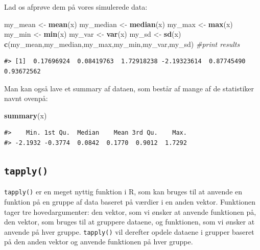 \documentclass[
]{book}
\newenvironment{Shaded}{\begin{snugshade}}{\end{snugshade}}
\newcommand{\CommentTok}[1]{\textcolor[rgb]{0.37,0.37,0.37}{\textit{#1}}}
\newcommand{\FunctionTok}[1]{\textcolor[rgb]{0.27,0.27,0.27}{\textbf{#1}}}
\newcommand{\NormalTok}[1]{#1}
\newcommand{\OtherTok}[1]{\textcolor[rgb]{0.37,0.37,0.37}{#1}}
\begin{document}
Lad os afprøve dem på vores simulerede data:

\begin{Shaded}
\begin{Highlighting}[]
\NormalTok{my\_mean }\OtherTok{\textless{}{-}} \FunctionTok{mean}\NormalTok{(x)}
\NormalTok{my\_median }\OtherTok{\textless{}{-}} \FunctionTok{median}\NormalTok{(x)}
\NormalTok{my\_max }\OtherTok{\textless{}{-}} \FunctionTok{max}\NormalTok{(x)}
\NormalTok{my\_min }\OtherTok{\textless{}{-}} \FunctionTok{min}\NormalTok{(x)}
\NormalTok{my\_var }\OtherTok{\textless{}{-}} \FunctionTok{var}\NormalTok{(x)}
\NormalTok{my\_sd }\OtherTok{\textless{}{-}} \FunctionTok{sd}\NormalTok{(x)}
\FunctionTok{c}\NormalTok{(my\_mean,my\_median,my\_max,my\_min,my\_var,my\_sd) }\CommentTok{\#print results}
\end{Highlighting}
\end{Shaded}

\begin{verbatim}
#> [1]  0.17696924  0.08419763  1.72918238 -2.19323614  0.87745490  0.93672562
\end{verbatim}

Man kan også lave et summary af dataen, som består af mange af de statistiker navnt ovenpå:

\begin{Shaded}
\begin{Highlighting}[]
\FunctionTok{summary}\NormalTok{(x)}
\end{Highlighting}
\end{Shaded}

\begin{verbatim}
#>    Min. 1st Qu.  Median    Mean 3rd Qu.    Max. 
#> -2.1932 -0.3774  0.0842  0.1770  0.9012  1.7292
\end{verbatim}

\subsection{\texorpdfstring{\texttt{tapply()}}{tapply()}}\label{tapply}

\texttt{tapply()} er en meget nyttig funktion i R, som kan bruges til at anvende en funktion på en gruppe af data baseret på værdier i en anden vektor. Funktionen tager tre hovedargumenter: den vektor, som vi ønsker at anvende funktionen på, den vektor, som bruges til at gruppere dataene, og funktionen, som vi ønsker at anvende på hver gruppe. \texttt{tapply()} vil derefter opdele dataene i grupper baseret på den anden vektor og anvende funktionen på hver gruppe.
\end{document}
